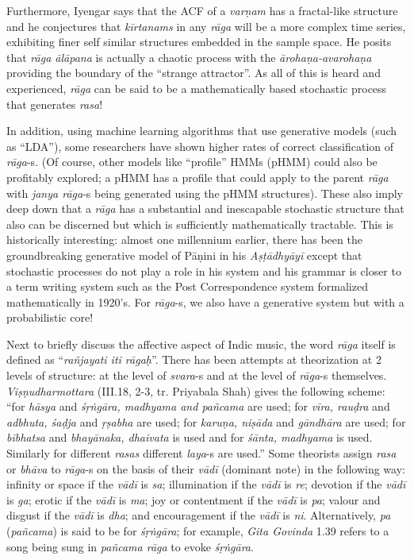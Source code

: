 Furthermore, Iyengar says that the ACF of a \textsl{varṇam} has a fractal-like structure and he conjectures that \textsl{kīrtanams} in any \textsl{rāga} will be a more complex time series, exhibiting finer self similar structures embedded in the sample space. He posits that \textsl{rāga ālāpana} is actually a chaotic process with the \textsl{ārohaṇa-avarohaṇa} providing the boundary of the “strange attractor”. As all of this is heard and experienced, \textsl{rāga} can be said to be a mathematically based stochastic process that generates \textsl{rasa}!

In addition, using machine learning algorithms that use generative models (such as “LDA”), some researchers have shown higher rates of correct classification of \textsl{rāga}-s. (Of course, other models like “profile” HMMs (pHMM) could also be profitably explored; a pHMM has a profile that could apply to the parent \textsl{rāga} with \textsl{janya rāga}-s being generated using the pHMM structures). These also imply deep down that a \textsl{rāga} has a substantial and inescapable stochastic structure that also can be discerned but which is sufficiently mathematically tractable. This is historically interesting: almost one millennium earlier, there has been the groundbreaking generative model of Pāṇini in his \textsl{Aṣṭādhyāyī} except that stochastic processes do not play a role in his system and his grammar is closer to a term writing system such as the Post Correspondence system formalized mathematically in 1920’s. For \textsl{rāga}-s, we also have a generative system but with a probabilistic core!

\newpage

Next to briefly discuss the affective aspect of Indic music, the word \textsl{rāga} itself is defined as “\textsl{rañjayati iti rāgaḥ}”. There has been attempts at theorization at 2 levels of structure: at the level of \textsl{svara}-s and at the level of \textsl{rāga}-s themselves. \textsl{Viṣṇudharmottara} (III.18, 2-3, tr. Priyabala Shah) gives the following scheme: “for \textsl{hāsya} and \textsl{śṛṅgāra, madhyama and pañcama} are used; for \textsl{vīra, rauḍra} and \textsl{adbhuta, śaḍja} and \textsl{ṛṣabha} are used; for \textsl{karuṇa, niṣāda} and \textsl{gāndhāra} are used; for \textsl{bībhatsa} and \textsl{bhayānaka, dhaivata} is used and for \textsl{śānta, madhyama} is used. Similarly for different \textsl{rasas} different \textsl{laya}-s are used.” Some theorists assign \textsl{rasa} or \textsl{bhāva} to \textsl{rāga}-s on the basis of their \textsl{vādī} (dominant note) in the following way: infinity or space if the \textsl{vādī} is \textsl{sa}; illumination if the \textsl{vādī} is \textsl{re}; devotion if the \textsl{vādī} is \textsl{ga}; erotic if the \textsl{vādī} is \textsl{ma}; joy or contentment if the \textsl{vādī} is \textsl{pa}; valour and disgust if the \textsl{vādī} is \textsl{dha}; and encouragement if the \textsl{vādī} is \textsl{ni}. Alternatively, \textsl{pa} (\textsl{pañcama}) is said to be for \textsl{śṛṅgāra}; for example, \textsl{Gita Govinda} 1.39 refers to a song being sung in \textsl{pañcama rāga} to evoke \textsl{śṛṅgāra}.

